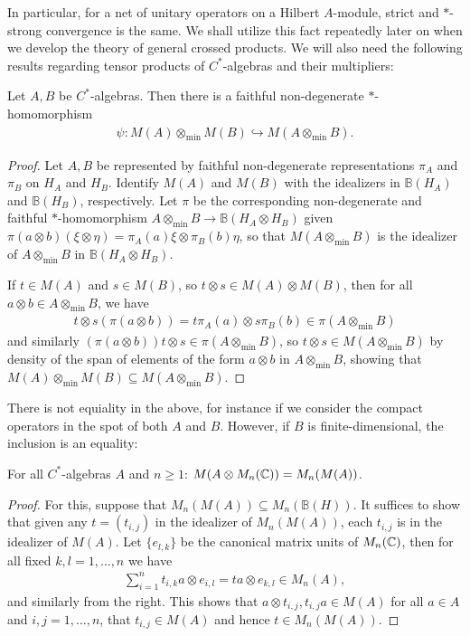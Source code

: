 In particular, for a net of unitary operators on a Hilbert $A$-module, strict and $*$-strong convergence is the same. We shall utilize this fact repeatedly later on when we develop the theory of general crossed products. We will also need the following results regarding tensor products of $C^*$-algebras and their multipliers:
\begin{theorem}
	Let $A,B$ be $C^*$-algebras. Then there is a faithful non-degenerate $*$-homomorphism
	\begin{align*}
		\psi \colon M(A) \otimes_{\min} M(B) \hookrightarrow M(A \otimes_{\min} B).
	\end{align*}
	\label{mult:mintens}
\end{theorem}
\begin{proof}
	Let $A,B$ be represented by faithful non-degenerate representations $\pi_A$ and $\pi_B$ on $H_A$ and $H_B$. Identify $M(A)$ and $M(B)$ with the idealizers in $\mathbb{B}(H_A)$ and $\mathbb{B}(H_B)$, respectively. Let $\pi$ be the corresponding non-degenerate and faithful $*$-homomorphism $A \otimes_{\min} B \to \mathbb{B}(H_A \otimes H_B)$ given $\pi(a \otimes b)(\xi \otimes \eta) = \pi_A(a) \xi \otimes \pi_B(b) \eta$, so that $M(A \otimes_{\min} B)$ is the idealizer of $A \otimes_{\min}B$ in $\mathbb{B}(H_A \otimes H_B)$.

	If $t \in M(A)$ and $s \in M(B)$, so $t \otimes s \in M(A) \otimes M(B)$, then for all $a \otimes b \in A \otimes_{\min} B$, we have 
	\begin{align*}
		t \otimes s (\pi(a \otimes b) ) = t \pi_A(a) \otimes s \pi_B(b) \in \pi(A \otimes_{\min} B)
	\end{align*}
	and similarly $(\pi(a \otimes b) ) t \otimes s \in \pi(A \otimes_{\min} B)$, so $t \otimes s \in M(A \otimes_{\min} B)$ by density of the span of elements of the form $a \otimes b$ in $A \otimes_{\min} B$, showing that $M(A) \otimes_{\min} M(B)  \subseteq M(A \otimes_{\min} B)$.
\end{proof}
There is not equiality in the above, for instance if we consider the compact operators in the spot of both $A$ and $B$. However, if $B$ is finite-dimensional, the inclusion is an equality:
\begin{lemma}
	For all $C^*$-algebras $A$ and $n \geq 1$: $M(A \otimes M_n(\mathbb{C}) ) = M_n(M(A))$.
\end{lemma}
\begin{proof}
	For this, suppose that $M_n(M(A)) \subseteq M_n(\mathbb{B}(H))$. It suffices to show that given any $t=(t_{i,j})$ in the idealizer of $M_{n}(M(A))$, each $t_{i,j}$ is in the idealizer of $M(A)$. Let $\{e_{l,k}\}$ be the canonical matrix units of $M_n(\mathbb{C})$, then for all fixed $k,l =1,\dots,n$ we have
	\begin{align*}
		\sum_{i=1}^n t_{i,k} a \otimes e_{i,l} = t a \otimes e_{k,l} \in M_n(A),
	\end{align*}
	and similarly from the right. This shows that $a \otimes t_{i,j}, t_{i,j} a \in M(A)$ for all $a \in A$ and $i,j = 1,\dots,n$, that $t_{i,j} \in M(A)$ and hence $t \in M_n(M(A))$.
\end{proof}
